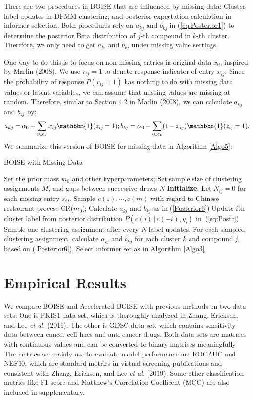 \documentclass[12pt]{article}
\begin{document}
There are two procedures in BOISE that are influenced by missing data: Cluster label updates in DPMM clustering, and posterior expectation calculation in informer selection. Both procedures rely on $a_{kj}$ and $b_{kj}$ in (\ref{eq:Posterior1}) to determine the posterior Beta distribution of $j$-th compound in $k$-th cluster. Therefore, we only need to get $a_{kj}$ and $b_{kj}$ under missing value settings. 

One way to do this is to focus on non-missing entries in original data $x_0$, inspired by Marlin (2008). We use $r_{ij} = 1$ to denote response indicator of entry $x_{ij}$. Since the probability of response $P(r_{ij} = 1)$ has nothing to do with missing data values or latent variables, we can assume that missing values are missing at random. Therefore, similar to Section 4.2 in Marlin (2008), we can calculate $a_{kj}$ and $b_{kj}$ by:
\begin{eqnarray}
\label{Posterior6}
a_{kj} = \alpha_0 + \sum_{i\in c_k} x_{ij} \mathbbm{1}(z_{ij} = 1); b_{kj} = \alpha_0 + \sum_{i\in c_k}(1- x_{ij}) \mathbbm{1}(z_{ij} = 1).
\end{eqnarray}
We summarize this version of BOISE for missing data in Algorithm \ref{Algo5}:
\begin{algorithm}
\caption{BOISE with Missing Data}\label{Algo5}
\begin{algorithmic}[1]
\State Set the prior mass $m_0$ and other hyperparameters;
\State Set sample size of clustering assignments $M$, and gaps between successive draws $N$
\State \textbf{Initialize}: Let $N_{ij} = 0$ for each missing entry $x_{ij}$. Sample $c(1),\cdots,c(m)$ with regard to Chinese restaurant process CR($m_0$);
        \State Calculate $a_{kj}$ and $b_{kj}$ as in (\ref{Posterior6})
        \State Update $i$th cluster label from posterior distribution $P(c(i)\,|\,c(-i),y_i)$ in~(\ref{eq:Postc})
    \EndFor
\State Sample one clustering assignment after every $N$ label updates.
\EndWhile
\State For each sampled clustering assignment, calculate $a_{kj}$ and $b_{kj}$ for each cluster $k$ and compound $j$, based on (\ref{Posterior6}).
\State Select informer set as in Algorithm \ref{Algo3}
\end{algorithmic}
\end{algorithm} 


\section{Empirical Results}
We compare BOISE and Accelerated-BOISE with previous methods on two data sets: One is PKIS1 data set, which is thoroughly analyzed in  Zhang, Ericksen, and Lee {\em et al.} (2019). The other is GDSC data set, which contains sensitivity data between cancer cell lines and anti-cancer drugs. Both data sets are matrices with continuous values and can be converted to binary matrices meaningfully. The metrics we mainly use to evaluate model performance are ROCAUC and NEF10, which are standard metrics in virtual screening publications and consistent with Zhang, Ericksen, and Lee {\em et al.} (2019). Some other  classification metrics like F1 score and Matthew's Correlation Coefficent (MCC) are also included in supplementary. 
\end{document}
